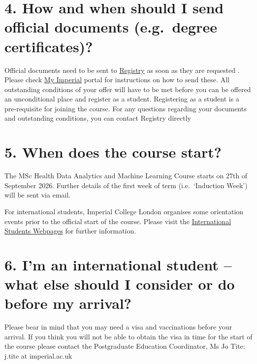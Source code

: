 \documentclass[
]{book}
\begin{document}
\section*{4. How and when should I send official documents (e.g.~degree certificates)?}\label{how-and-when-should-i-send-official-documents-e.g.-degree-certificates}

Official documents need to be sent to \href{https://www.imperial.ac.uk/admin-services/registry/}{Registry} as soon as they are requested . Please check \href{https://www.imperial.ac.uk/admin-services/ict/self-service/admin-systems/my-imperial/}{My Imperial} portal for instructions on how to send these. All outstanding conditions of your offer will have to be met before you can be offered an unconditional place and register as a student. Registering as a student is a pre-requisite for joining the course. For any questions regarding your documents and outstanding conditions, you can contact Registry directly

\section*{5. When does the course start?}\label{when-does-the-course-start}

The MSc Health Data Analytics and Machine Learning Course starts on 27th of September 2026. Further details of the first week of term (i.e.~`Induction Week') will be sent via email.

For international students, Imperial College London organises some orientation events prior to the official start of the course. Please visit the \href{https://www.imperial.ac.uk/study/international-students/}{International Students Webpages} for further information.

\section*{6. I'm an international student -- what else should I consider or do before my arrival?}\label{im-an-international-student-what-else-should-i-consider-or-do-before-my-arrival}

Please bear in mind that you may need a visa and vaccinations before your arrival.
If you think you will not be able to obtain the visa in time for the start of the course please contact the Postgraduate Education Coordinator, Ms Jo Tite: j.tite at imperial.ac.uk
\end{document}
